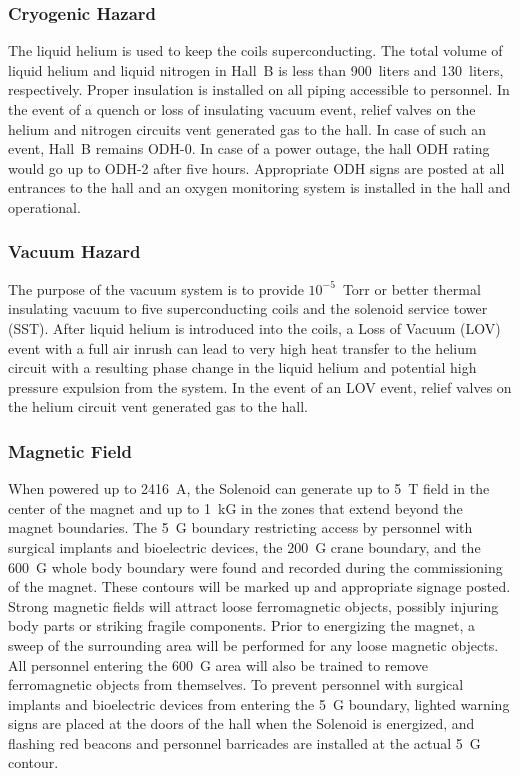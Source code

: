 \subsubsection{Cryogenic Hazard}

The liquid helium is used to keep the coils superconducting. The 
total volume of liquid helium and liquid nitrogen in Hall~B is less than 900~liters and 
130~liters, respectively. Proper insulation is installed on all piping accessible to 
personnel. In the event of a quench or loss of insulating vacuum event, relief valves on 
the helium and nitrogen circuits vent generated gas to the hall. In case of such an event, 
Hall~B remains ODH-0. In case of a power outage, the hall ODH rating would go up to ODH-2 
after five hours. Appropriate ODH signs are posted at all entrances to the hall and an 
oxygen monitoring system is installed in the hall and operational.

\subsubsection{Vacuum Hazard}

The purpose of the vacuum system is to provide $10^{-5}$~Torr or better thermal insulating 
vacuum to five superconducting coils and the solenoid service tower (SST). After liquid helium 
is introduced into the coils, a Loss of Vacuum (LOV) event with a full air inrush can lead to
very high heat transfer to the helium circuit with a resulting phase change in 
the liquid helium and potential high pressure expulsion from the system. In the 
event of an LOV event, relief valves on the helium circuit vent generated
gas to the hall.

\subsubsection{Magnetic Field}

When powered up to 2416~A, the Solenoid can generate up to 5~T field in the center of the 
magnet and up to 1~kG in the zones that extend beyond the magnet boundaries. The 5~G 
boundary restricting access by personnel with surgical implants and bioelectric devices, 
the 200~G crane boundary, and the 600~G whole body boundary were found and recorded during 
the commissioning of the magnet. These contours will be marked up and appropriate signage 
posted. Strong magnetic fields will attract loose ferromagnetic objects, possibly injuring 
body parts or striking fragile components. Prior to energizing the magnet, a sweep of the
surrounding area will be performed for any loose magnetic objects. All personnel entering 
the 600~G area will also be trained to remove ferromagnetic objects from themselves. To 
prevent personnel with surgical implants and bioelectric devices from entering the 5~G
boundary, lighted warning signs are placed at the doors of the hall when the Solenoid is 
energized, and flashing red beacons and personnel barricades are installed at the actual 5~G 
contour.

